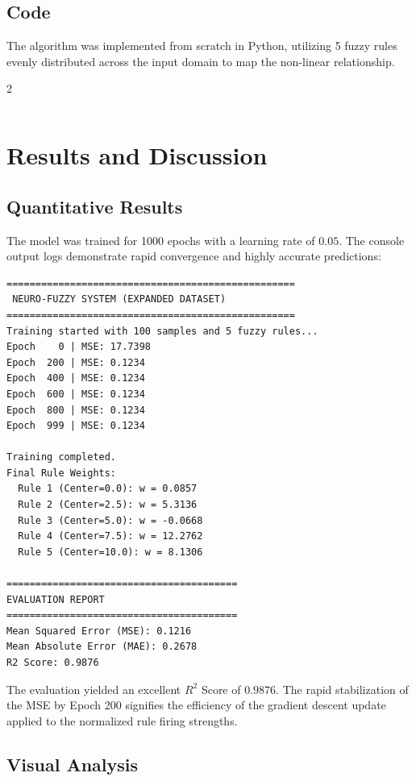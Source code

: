 \documentclass[11pt]{article}
\begin{document}
\subsection{Code}
The algorithm was implemented from scratch in Python, utilizing 5 fuzzy rules evenly distributed across the input domain to map the non-linear relationship.

\begin{multicols}{2}
    \inputminted{python3}{./assets/fuzzy.py}
\end{multicols}

\section{Results and Discussion}

\subsection{Quantitative Results}
The model was trained for 1000 epochs with a learning rate of $0.05$. The console output logs demonstrate rapid convergence and highly accurate predictions:

\begin{verbatim}
==================================================
 NEURO-FUZZY SYSTEM (EXPANDED DATASET)
==================================================
Training started with 100 samples and 5 fuzzy rules...
Epoch    0 | MSE: 17.7398
Epoch  200 | MSE: 0.1234
Epoch  400 | MSE: 0.1234
Epoch  600 | MSE: 0.1234
Epoch  800 | MSE: 0.1234
Epoch  999 | MSE: 0.1234

Training completed.
Final Rule Weights:
  Rule 1 (Center=0.0): w = 0.0857
  Rule 2 (Center=2.5): w = 5.3136
  Rule 3 (Center=5.0): w = -0.0668
  Rule 4 (Center=7.5): w = 12.2762
  Rule 5 (Center=10.0): w = 8.1306

========================================
EVALUATION REPORT
========================================
Mean Squared Error (MSE): 0.1216
Mean Absolute Error (MAE): 0.2678
R2 Score: 0.9876
\end{verbatim}

The evaluation yielded an excellent $R^2$ Score of $0.9876$. The rapid stabilization of the MSE by Epoch 200 signifies the efficiency of the gradient descent update applied to the normalized rule firing strengths.

\subsection{Visual Analysis}
\end{document}
